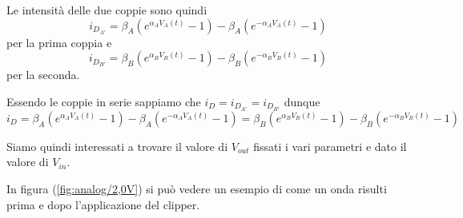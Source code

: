 		Le intensità delle due coppie sono quindi
		\[
			i_{D_{A'}} = \beta_{A}\left(e^{\alpha_{A}V_{A}(t)}-1\right)-\beta_{A}\left(e^{-\alpha_{A}V_{A}(t)}-1\right)
		\]
		per la prima coppia e
		\[
			i_{D_{B'}} = \beta_{B}\left(e^{\alpha_{B}V_{B}(t)}-1\right)-\beta_{B}\left(e^{-\alpha_{B}V_{B}(t)}-1\right)
		\]
		per la seconda.
		
		Essendo le coppie in serie sappiamo che $i_{D} = i_{D_{A'}} = i_{D_{B'}}$ dunque
		\[
			i_{D} = \beta_{A}\left(e^{\alpha_{A}V_{A}(t)}-1\right)-\beta_{A}\left(e^{-\alpha_{A}V_{A}(t)}-1\right) = \beta_{B}\left(e^{\alpha_{B}V_{B}(t)}-1\right)-\beta_{B}\left(e^{-\alpha_{B}V_{B}(t)}-1\right)
		\]
		
		Siamo quindi interessati a trovare il valore di $V_{out}$ fissati i vari parametri e dato il valore di $V_{in}$.
		
		\vspace{40px}
		In figura (\ref{fig:analog/2,0V}) si può vedere un esempio di come un onda risulti prima e dopo l'applicazione del clipper.
		
